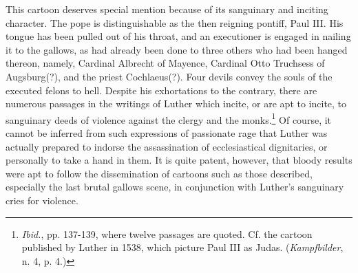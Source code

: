 This cartoon deserves special mention because of its sanguinary
and inciting character. The pope is distinguishable as the then reigning
pontiff, Paul III. His tongue has
been pulled out of his throat, and an executioner is engaged in nailing
it to the gallows, as had already been done to three others who had
been hanged thereon, namely, Cardinal Albrecht of Mayence, Cardinal Otto
Truchsess of Augsburg(?), and the priest Cochlaeus(?).
Four devils convey the souls of the executed felons to hell. Despite
his exhortations to the contrary, there are numerous passages in the
writings of Luther which incite, or are apt to incite, to sanguinary
deeds of violence against the clergy and the monks.\footnote
{\textit{Ibid.}, pp. 137-139, where twelve passages are quoted. Cf. the cartoon published by
Luther in 1538, which picture Paul III as Judas. (\textit{Kampfbilder}, n. 4, p. 4.)}
Of course, it
cannot be inferred from such expressions of passionate rage that
Luther was actually prepared to indorse the assassination of ecclesiastical
dignitaries, or personally to take a hand in them. It is quite patent,
however, that bloody results were apt to follow the dissemination
of cartoons such as those described, especially the last brutal
gallows scene, in conjunction with Luther’s sanguinary cries for violence.
